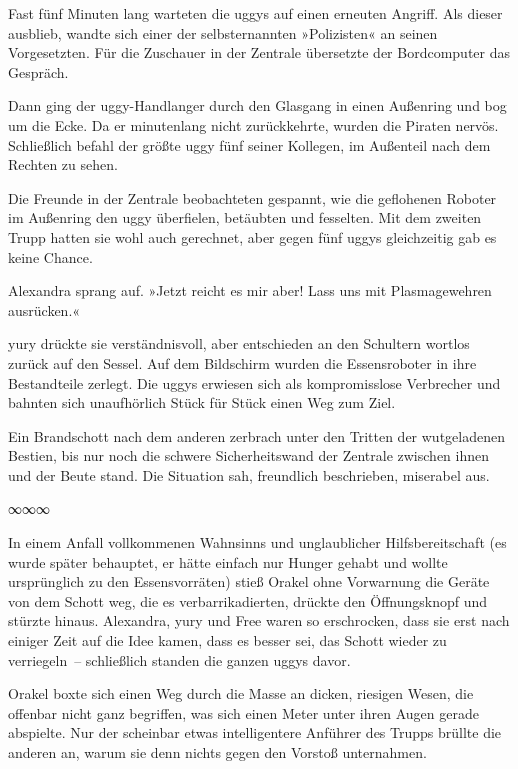 Fast fünf Minuten lang warteten die uggys auf einen erneuten Angriff. Als dieser ausblieb, wandte sich einer der selbsternannten »Polizisten« an seinen Vorgesetzten. Für die Zuschauer in der Zentrale übersetzte der Bordcomputer das Gespräch.


Dann ging der uggy-Handlanger durch den Glasgang in einen Außenring und bog um die Ecke. Da er minutenlang nicht zurückkehrte, wurden die Piraten nervös. Schließlich befahl der größte uggy fünf seiner Kollegen, im Außenteil nach dem Rechten zu sehen.

Die Freunde in der Zentrale beobachteten gespannt, wie die geflohenen Roboter im Außenring den uggy überfielen, betäubten und fesselten. Mit dem zweiten Trupp hatten sie wohl auch gerechnet, aber gegen fünf uggys gleichzeitig gab es keine Chance.

Alexandra sprang auf. »Jetzt reicht es mir aber! Lass uns mit Plasmagewehren ausrücken.«

yury drückte sie verständnisvoll, aber entschieden an den Schultern wortlos zurück auf den Sessel. Auf dem Bildschirm wurden die Essensroboter in ihre Bestandteile zerlegt. Die uggys erwiesen sich als kompromisslose Verbrecher und bahnten sich unaufhörlich Stück für Stück einen Weg zum Ziel.

Ein Brandschott nach dem anderen zerbrach unter den Tritten der wutgeladenen Bestien, bis nur noch die schwere Sicherheitswand der Zentrale zwischen ihnen und der Beute stand. Die Situation sah, freundlich beschrieben, miserabel aus.

\begin{center}
    ∞∞∞
\end{center}

In einem Anfall vollkommenen Wahnsinns und unglaublicher Hilfsbereitschaft (es wurde später behauptet, er hätte einfach nur Hunger gehabt und wollte ursprünglich zu den Essensvorräten) stieß Orakel ohne Vorwarnung die Geräte von dem Schott weg, die es verbarrikadierten, drückte den Öffnungsknopf und stürzte hinaus. Alexandra, yury und Free waren so erschrocken, dass sie erst nach einiger Zeit auf die Idee kamen, dass es besser sei, das Schott wieder zu verriegeln~– schließlich standen die ganzen uggys davor.

Orakel boxte sich einen Weg durch die Masse an dicken, riesigen Wesen, die offenbar nicht ganz begriffen, was sich einen Meter unter ihren Augen gerade abspielte. Nur der scheinbar etwas intelligentere Anführer des Trupps brüllte die anderen an, warum sie denn nichts gegen den Vorstoß unternahmen.

